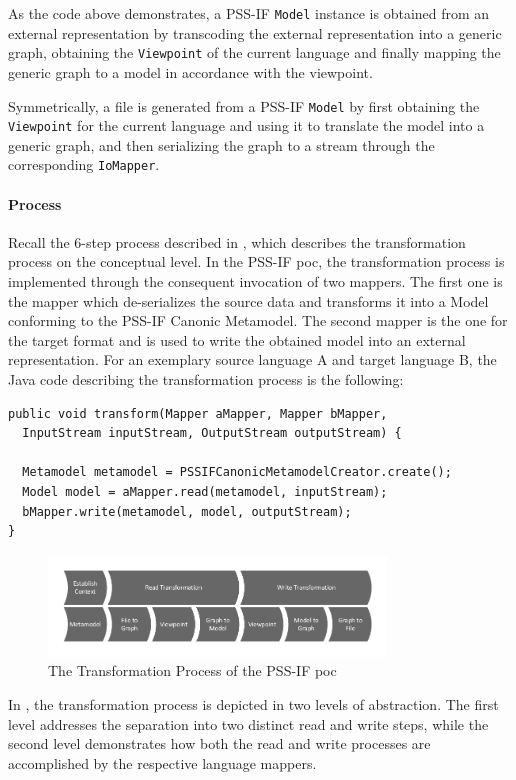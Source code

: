 As the code above demonstrates, a PSS-IF \texttt{Model} instance is obtained from an external representation by transcoding the external representation into a generic graph, obtaining the \texttt{Viewpoint} of the current language and finally mapping the generic graph to a model in accordance with the viewpoint.

Symmetrically, a file is generated from a PSS-IF \texttt{Model} by first obtaining the \texttt{View\-point} for the current language and using it to translate the model into a generic graph, and then serializing the graph to a stream through the corresponding \texttt{IoMapper}.

\paragraph{Process}

Recall the 6-step process described in , which describes the transformation process on the conceptual level. In the PSS-IF \gls{poc}, the transformation process is implemented through the consequent invocation of two mappers. The first one is the mapper which de-serializes the source data and transforms it into a Model conforming to the PSS-IF Canonic Metamodel. The second mapper is the one for the target format and is used to write the obtained model into an external representation. For an exemplary source language A and target language B, the Java code describing the transformation process is the following:

\begin{verbatim}
public void transform(Mapper aMapper, Mapper bMapper,
  InputStream inputStream, OutputStream outputStream) {
  
  Metamodel metamodel = PSSIFCanonicMetamodelCreator.create();
  Model model = aMapper.read(metamodel, inputStream);
  bMapper.write(metamodel, model, outputStream);
}
\end{verbatim}

\begin{figure}[h]
\centering
\includegraphics[width=0.8\textwidth]{figures/process.pdf}
\caption{The Transformation Process of the PSS-IF \gls{poc}}
\label{fig:transformationprocess}
\end{figure}

In , the transformation process is depicted in two levels of abstraction. The first level addresses the separation into two distinct read and write steps, while the second level demonstrates how both the read and write processes are accomplished by the respective language mappers.

